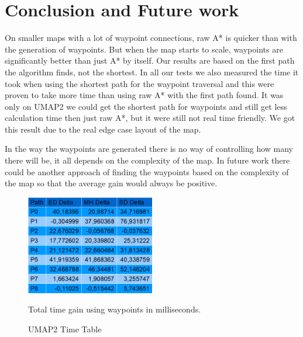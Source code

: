 \documentclass[sigconf]{acmart}
\begin{document}
\section{Conclusion and Future work}
On smaller maps with a lot of waypoint connections, raw A* is quicker than with the generation of waypoints. But when the map starts to scale, waypoints are significantly better than just A* by itself.
Our results are based on the first path the algorithm finds, not the shortest. In all our tests we also measured the time it took when using the shortest path for the waypoint traversal and this were proven to take more time than using raw A* with the first path found. It was only on UMAP2 we could get the shortest path for waypoints and still get less calculation time then just raw A*, but it were still not real time friendly. We got this result due to the real edge case layout of the map.
	
In the way the waypoints are generated there is no way of controlling how many there will be, it all depends on the complexity of the map. In future work there could be another approach of finding the waypoints based on the complexity of the map so that the average gain would always be positive.

\begin{figure}[h!]
\centering
\includegraphics[width=0.5\textwidth,height=\textheight,keepaspectratio]{ChartsAndFigures/UMAP2_timeTable.png}
\caption{UMAP2 Time Table}
Total time gain using waypoints in milliseconds.
\label{fig:UMAP2_cd}
\end{figure}
\end{document}
